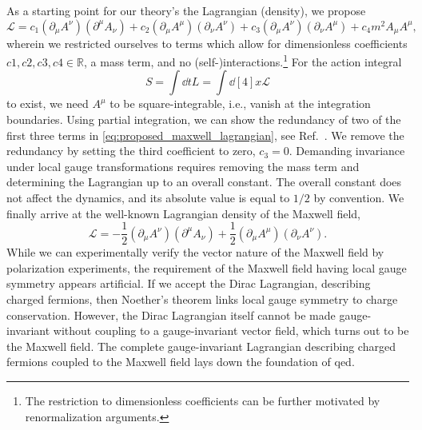 As a starting point for our theory's the Lagrangian (density), we propose
\begin{equation}
	\mathcal{L}
	=
	c_1
	\left(
		\partial_\mu
		A^\nu
	\right)
	\left(
		\partial^\mu
		A_\nu
	\right)
	+
	c_2
	\left(
		\partial_\mu
		A^\mu
	\right)
	\left(
		\partial_\nu
		A^\nu
	\right)
	+
	c_3
	\left(
		\partial_\mu
		A^\nu
	\right)
	\left(
		\partial_\nu
		A^\mu
	\right)
	+
	c_4
	m^2
	A_\mu A^\mu
	\label{eq:proposed_maxwell_lagrangian_proposal},
\end{equation}
wherein we restricted ourselves to terms which allow for dimensionless coefficients $c1,c2,c3,c4\in\mathbb{R}$, a mass term, and no (self-)interactions.\footnote{The restriction to dimensionless coefficients can be further motivated by renormalization arguments.}
For the action integral
\begin{equation}
	S
	=
	\int\dd{t}
	L
	=
	\int\dd[4]{x}
	\mathcal{L}
\end{equation}
to exist, we need $A^\mu$ to be square-integrable, i.e., vanish at the integration boundaries.
Using partial integration, we can show the redundancy of two of the first three terms in \cref{eq:proposed_maxwell_lagrangian}, see Ref.~\cite{deRham2014}.
We remove the redundancy by setting the third coefficient to zero, $c_3=0$.
Demanding invariance under local gauge transformations requires removing the mass term and determining the Lagrangian up to an overall constant.
The overall constant does not affect the dynamics, and its absolute value is equal to $1/2$ by convention.
We finally arrive at the well-known Lagrangian density of the Maxwell field,
\begin{equation}
	\mathcal{L}
	=
	-
	\frac{1}{2}
	\left(
		\partial_\mu
		A^\nu
	\right)
	\left(
		\partial^\mu
		A_\nu
	\right)
	+
	\frac{1}{2}
	\left(
		\partial_\mu
		A^\mu
	\right)
	\left(
		\partial_\nu
		A^\nu
	\right)
	.
\end{equation}
While we can experimentally verify the vector nature of the Maxwell field by polarization experiments, the requirement of the Maxwell field having local gauge symmetry appears artificial.
If we accept the Dirac Lagrangian, describing charged fermions, then Noether's theorem links local gauge symmetry to charge conservation.
However, the Dirac Lagrangian itself cannot be made gauge-invariant without coupling to a gauge-invariant vector field, which turns out to be the Maxwell field.
The complete gauge-invariant Lagrangian describing charged fermions coupled to the Maxwell field lays down the foundation of \gls{qed}.

